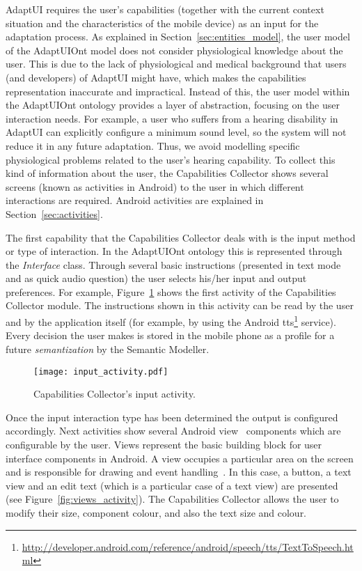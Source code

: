 AdaptUI requires the user's capabilities (together with the current context
situation and the characteristics of the mobile device) as an input  for the
adaptation process. As explained in Section~\ref{sec:entities_model}, the user
model of the AdaptUIOnt model does not consider physiological knowledge about
the user. This is due to the lack of physiological and medical background that
users (and developers) of AdaptUI might have, which makes the capabilities
representation inaccurate and impractical. Instead of this, the user model
within the AdaptUIOnt ontology provides a layer of abstraction, focusing on the
user interaction needs. For example, a user who suffers from a hearing disability
in AdaptUI can explicitly configure a minimum sound level, so the system will
not reduce it in any future adaptation. Thus, we avoid modelling specific
physiological problems related to the user's hearing capability. To collect this
kind of information about the user, the Capabilities Collector shows several
screens (known as activities in Android) to the user in which different
interactions are required. Android activities are explained in Section~\ref{sec:activities}.

The first capability that the Capabilities Collector deals with is the input
method or type of interaction. In the AdaptUIOnt ontology this is represented
through the \textit{Interface} class. Through several basic instructions
(presented in text mode and as quick audio question) the user selects his/her
input and output preferences. For example, Figure~\ref{fig:input_activity} shows
the first activity of the Capabilities Collector module. The instructions shown
in this activity can be read by the user and by the application itself (for
example, by using the Android \ac{tts}\footnote{\url{http://developer.android.com/reference/android/speech/tts/TextToSpeech.html}} service). Every decision
the user makes is stored in the mobile phone as a profile for a future
\textit{semantization} by the Semantic Modeller.

\begin{figure}
\centering
\texttt{[image: input\_activity.pdf]}
\caption{Capabilities Collector's input activity.}
\label{fig:input_activity}
\end{figure}

Once the input interaction type has been determined the output is configured 
accordingly. Next activities show several Android view~\citep{android_view} 
components which are configurable by the user. Views represent the basic 
building block for user interface components in Android. A view occupies a 
particular area on the screen and is responsible for drawing and event 
handling~\citep{android_view}. In this case, a button, a text view and an 
edit text (which is a particular case of a text view) are presented (see 
Figure~\ref{fig:views_activity}). The Capabilities Collector allows the user to 
modify their size, component colour, and also the text size and colour.

